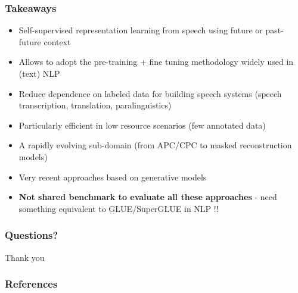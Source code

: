 \documentclass[table]{beamer}
\begin{document}
\begin{frame}
\frametitle{Takeaways}

		\begin{itemize}
			\item Self-supervised representation learning from speech using future or past-future context
			\item Allows to adopt the pre-training + fine tuning methodology widely used in (text) NLP 
			\item Reduce dependence on labeled data for building speech systems (speech transcription, translation, paralinguistics)
			\item Particularly efficient in low resource scenarios (few annotated data)
			\item A rapidly evolving sub-domain (from APC/CPC to masked reconstruction models) 
			\item Very recent approaches based on generative models \citep{khurana2020convolutional}
			\item \textbf{Not shared benchmark to evaluate all these approaches} - need something equivalent to GLUE/SuperGLUE in NLP !!
		\end{itemize}
\end{frame}













\begin{frame}
	\frametitle{Questions?}
	
	\vfill
	\centerline{\Huge Thank you}
	\vfill
\end{frame}












\begin{frame}[allowframebreaks]
        \frametitle{References}
        {\scriptsize
        
        }
\end{frame}    
\end{document}
